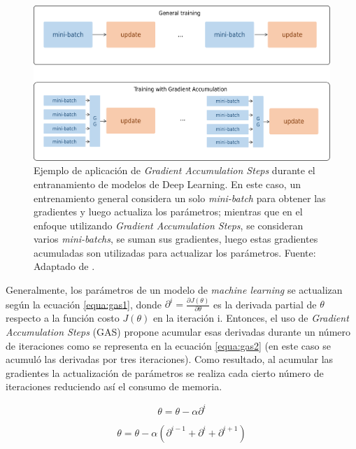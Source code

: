 \begin{figure}[H]
	\centering
	\includegraphics[width=\textwidth]{../img/proposal/gas_own}	
	\caption[Ejemplo de aplicación de \textit{Gradient Accumulation Steps}]{Ejemplo de aplicación de \textit{Gradient Accumulation Steps} durante el entranamiento de modelos de Deep Learning. En este caso, un entrenamiento general considera un solo \textit{mini-batch} para obtener las gradientes y luego actualiza los parámetros; mientras que en el enfoque utilizando \textit{Gradient Accumulation Steps}, se consideran varios \textit{mini-batchs}, se suman sus gradientes, luego estas gradientes acumuladas son utilizadas para actualizar los parámetros.  Fuente: Adaptado de  \cite{prince2023understanding}.}		
	\label{fig:gas_example}
\end{figure}

Generalmente, los parámetros de un modelo de \textit{machine learning} se actualizan según la ecuación \ref{equa:gas1}, donde $ \partial^i = \frac{\partial J(\theta)}{\partial \theta}   $ es la derivada partial de $\theta$ respecto a la función costo $J(\theta)$ en la iteración i. Entonces, el uso de \textit{Gradient Accumulation Steps} (GAS) propone acumular esas derivadas durante un número de iteraciones como se representa en la ecuación \ref{equa:gas2} (en este caso se acumuló las derivadas por tres iteraciones). Como resultado, al acumular las gradientes la actualización de parámetros se realiza cada cierto número de iteraciones reduciendo así el consumo de memoria. 

\begin{equation}\label{equa:gas1}
	\theta = \theta - \alpha \partial^{i}
\end{equation}

\begin{equation}\label{equa:gas2}
	\theta = \theta - \alpha (\partial^{i-1} + \partial^{i} + \partial^{i+1})
\end{equation}



